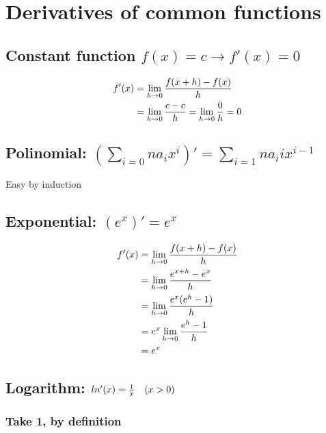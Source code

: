 \section{Derivatives of common functions}

\subsection{Constant function $f(x)=c \rightarrow f'(x)=0$}

\begin{align*}
f'(x)&=\lim\limits_{h \rightarrow 0}  \frac{f(x+h)-f(x)}{h}
\\ &= \lim\limits_{h \rightarrow 0}  \frac{c-c}{h}
= \lim\limits_{h \rightarrow 0}  \frac{0}{h}
= 0
\end{align*}

\subsection{Polinomial: $(\sum_{i=0}{n} a_i x^i)'=\sum_{i=1}{n} a_i i x^{i-1} $}

Easy by induction

\subsection{Exponential: $(e^x)'=e^x$}

\begin{align*}
f'(x)&=\lim\limits_{h \rightarrow 0}  \frac{f(x+h)-f(x)}{h}
\\ &= \lim\limits_{h \rightarrow 0}  \frac{e^{x+h}-e^x}{h}
\\ &= \lim\limits_{h \rightarrow 0}  \frac{e^x (e^h-1)}{h}
\\ &= e^x \lim\limits_{h \rightarrow 0}  \frac{ e^h-1}{h}
\\ &= e^x
\end{align*}

\subsection{Logarithm: $ln'(x) = \frac{1}{x} \quad (x>0) $}

\subsubsection{Take 1, by definition }



